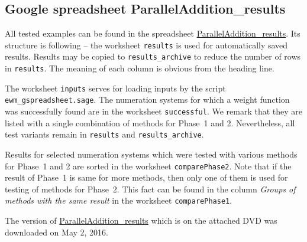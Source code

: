 \subsection*{Google spreadsheet ParallelAddition\_results}
All tested examples can be found in the spreadsheet \href{https://docs.google.com/spreadsheets/d/1TnhrHdefHfHa0WSeVs4q6XVj3epjPlPlnoekE0E1xeM/edit?usp=sharing}{ParallelAddition\_results}. Its structure is following -- the worksheet \verb+results+ is used for automatically saved results. Results may be copied to \verb+results_archive+ to reduce the number of rows in \verb+results+. The meaning of each column is obvious from the heading line. 

The worksheet \verb+inputs+ serves for loading inputs by the script \verb+ewm_gspreadsheet.sage+. The numeration systems for which a weight function was successfully found are in the worksheet \verb+successful+. We remark that they are listed with a single combination of methods for Phase~1 and 2. Nevertheless, all test variants remain in \verb+results+ and \verb+results_archive+. 

Results for selected numeration systems which were tested with various  methods for Phase~1 and 2 are sorted in the worksheet \verb+comparePhase2+. Note that if the result of Phase~1 is same for more methods, then only one of them is used for testing of methods for Phase~2. This fact can be found in the column \emph{Groups of methods with the same result} in the worksheet \verb+comparePhase1+.

The version of \href{https://docs.google.com/spreadsheets/d/1TnhrHdefHfHa0WSeVs4q6XVj3epjPlPlnoekE0E1xeM/edit?usp=sharing}{ParallelAddition\_results} which is on the attached DVD was downloaded on May 2, 2016.
